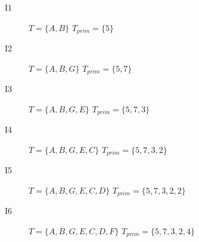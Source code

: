 \documentclass[12pt]{article}
\begin{document}
\begin{description}
\item [I1]

$T = \{A, B\}$
$T_{prim} = \{5\}$

\item [I2] 

$T = \{A, B, G\}$
$T_{prim} = \{5, 7\}$

\item [I3] 

$T = \{A, B, G, E\}$
$T_{prim} = \{5, 7, 3\}$

\item [I4] 

$T = \{A, B, G, E, C\}$
$T_{prim} = \{5, 7, 3, 2\}$

\item [I5] 

$T = \{A, B, G, E, C, D\}$
$T_{prim} = \{5, 7, 3, 2, 2\}$

\item [I6] 

$T = \{A, B, G, E, C, D, F\}$
$T_{prim} = \{5, 7, 3, 2, 4\}$
\end{description}
\end{document}
